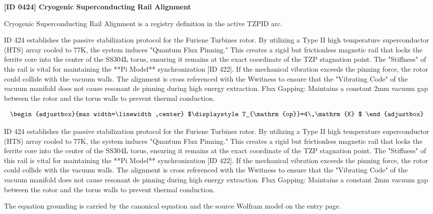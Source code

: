 \clearpage
\noindent\textbf{[ID 0424] Cryogenic Superconducting Rail Alignment}\par
\vspace{0.35em}
\begingroup\small
{}
Cryogenic Superconducting Rail Alignment is a registry definition in the active TZPID arc.

ID 424 establishes the passive stabilization protocol for the Furiene Turbines rotor. By utilizing a Type II high temperature superconductor (HTS) array cooled to 77K, the system induces "Quantum Flux Pinning." This creates a rigid but frictionless magnetic rail that locks the ferrite core into the center of the SS304L torus, ensuring it remains at the exact coordinate of the TZP stagnation point. The "Stiffness" of this rail is vital for maintaining the **Pi Model** synchronization [ID 422]. If the mechanical vibration exceeds the pinning force, the rotor could collide with the vacuum walls. The alignment is cross referenced with the Wwitness to ensure that the "Vibrating Code" of the vacuum manifold does not cause resonant de pinning during high energy extraction. Flux Gapping: Maintains a constant 2mm vacuum gap between the rotor and the torus walls to prevent thermal conduction.

\[
\begin{adjustbox}{max width=\linewidth,center}
$\displaystyle
T_{\mathrm{op}}=4\,\mathrm{K}
$
\end{adjustbox}
\]

ID 424 establishes the passive stabilization protocol for the Furiene Turbines rotor. By utilizing a Type II high temperature superconductor (HTS) array cooled to 77K, the system induces "Quantum Flux Pinning." This creates a rigid but frictionless magnetic rail that locks the ferrite core into the center of the SS304L torus, ensuring it remains at the exact coordinate of the TZP stagnation point. The "Stiffness" of this rail is vital for maintaining the **Pi Model** synchronization [ID 422]. If the mechanical vibration exceeds the pinning force, the rotor could collide with the vacuum walls. The alignment is cross referenced with the Wwitness to ensure that the "Vibrating Code" of the vacuum manifold does not cause resonant de pinning during high energy extraction. Flux Gapping: Maintains a constant 2mm vacuum gap between the rotor and the torus walls to prevent thermal conduction.

The equation grounding is carried by the canonical equation and the source Wolfram model on the entry page.

